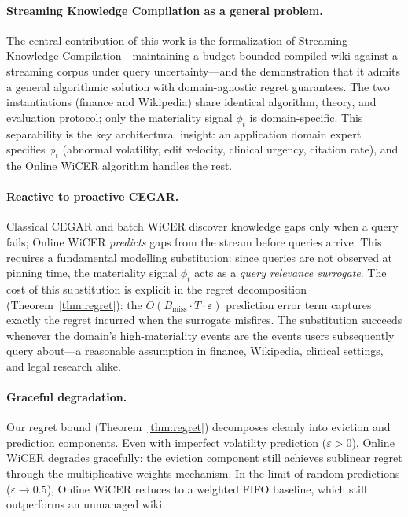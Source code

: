 \documentclass{article}
\begin{document}
\paragraph{Streaming Knowledge Compilation as a general problem.}
The central contribution of this work is the formalization of Streaming Knowledge Compilation---maintaining a budget-bounded compiled wiki against a streaming corpus under query uncertainty---and the demonstration that it admits a general algorithmic solution with domain-agnostic regret guarantees.
The two instantiations (finance and Wikipedia) share identical algorithm, theory, and evaluation protocol; only the materiality signal $\phi_t$ is domain-specific.
This separability is the key architectural insight: an application domain expert specifies $\phi_t$ (abnormal volatility, edit velocity, clinical urgency, citation rate), and the Online WiCER algorithm handles the rest.

\paragraph{Reactive to proactive CEGAR.}
Classical CEGAR and batch WiCER discover knowledge gaps only when a query fails; Online WiCER \emph{predicts} gaps from the stream before queries arrive.
This requires a fundamental modelling substitution: since queries are not observed at pinning time, the materiality signal $\phi_t$ acts as a \emph{query relevance surrogate}.
The cost of this substitution is explicit in the regret decomposition (Theorem~\ref{thm:regret}): the $O(B_{\text{miss}} \cdot T \cdot \varepsilon)$ prediction error term captures exactly the regret incurred when the surrogate misfires.
The substitution succeeds whenever the domain's high-materiality events are the events users subsequently query about---a reasonable assumption in finance, Wikipedia, clinical settings, and legal research alike.

\paragraph{Graceful degradation.}
Our regret bound (Theorem~\ref{thm:regret}) decomposes cleanly into eviction and prediction components.
Even with imperfect volatility prediction ($\varepsilon > 0$), Online WiCER degrades gracefully: the eviction component still achieves sublinear regret through the multiplicative-weights mechanism.
In the limit of random predictions ($\varepsilon \to 0.5$), Online WiCER reduces to a weighted FIFO baseline, which still outperforms an unmanaged wiki.
\end{document}
